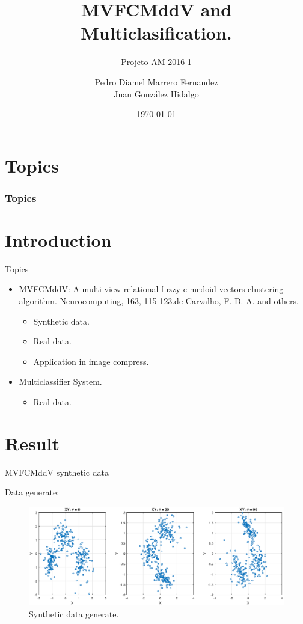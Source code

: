 \documentclass{beamer}
\title{MVFCMddV and Multiclasification.}
\subtitle{Projeto AM 2016-1}
\author{Pedro Diamel Marrero Fernandez \\ Juan González Hidalgo }
\institute{Universidade Federal de Pernambuco\\Brasil {\Medium CIN}}
\date{\today}
\begin{document}
\maketitle

\section*{Topics}
\begin{frame}
	\frametitle{Topics}
	\tableofcontents[hideallsubsections]
\end{frame}

\section{Introduction}

\begin{frame}{Topics}	
\begin{itemize}
\item MVFCMddV: A multi-view relational fuzzy c-medoid vectors clustering algorithm. Neurocomputing, 163, 115-123.de Carvalho, F. D. A. and others.
\begin{itemize}
\item Synthetic data.
\item Real data.
\item Application in image compress.
\end{itemize}
\item Multiclassifier System.
\begin{itemize}
\item Real data.
\end{itemize}

\end{itemize}
\end{frame}


\section{Result}



\begin{frame}{MVFCMddV synthetic data}

Data generate:

\begin{figure}[h]
\centering
\includegraphics[width=4.5in]{../out/xy-sinteticos.eps}
\caption{Synthetic data generate.}
\label{fig:xy_sinteticos}
\end{figure}  

\end{frame}
\end{document}
